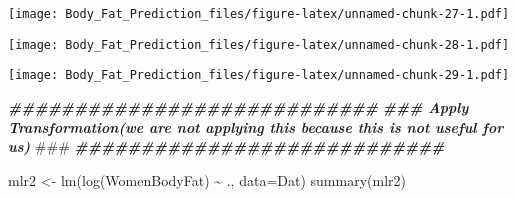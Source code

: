 \documentclass[
]{article}
\newenvironment{Shaded}{\begin{snugshade}}{\end{snugshade}}
\newcommand{\AlertTok}[1]{\textcolor[rgb]{0.94,0.16,0.16}{#1}}
\newcommand{\AttributeTok}[1]{\textcolor[rgb]{0.77,0.63,0.00}{#1}}
\newcommand{\DecValTok}[1]{\textcolor[rgb]{0.00,0.00,0.81}{#1}}
\newcommand{\DocumentationTok}[1]{\textcolor[rgb]{0.56,0.35,0.01}{\textbf{\textit{#1}}}}
\newcommand{\FunctionTok}[1]{\textcolor[rgb]{0.00,0.00,0.00}{#1}}
\newcommand{\NormalTok}[1]{#1}
\newcommand{\OtherTok}[1]{\textcolor[rgb]{0.56,0.35,0.01}{#1}}
\newcommand{\SpecialCharTok}[1]{\textcolor[rgb]{0.00,0.00,0.00}{#1}}
\newcommand{\StringTok}[1]{\textcolor[rgb]{0.31,0.60,0.02}{#1}}
\begin{document}
\texttt{[image: Body\_Fat\_Prediction\_files/figure-latex/unnamed-chunk-27-1.pdf]}

\begin{Shaded}
\end{Shaded}

\texttt{[image: Body\_Fat\_Prediction\_files/figure-latex/unnamed-chunk-28-1.pdf]}

\begin{Shaded}
\end{Shaded}

\texttt{[image: Body\_Fat\_Prediction\_files/figure-latex/unnamed-chunk-29-1.pdf]}

\begin{Shaded}
\begin{Highlighting}[]
\DocumentationTok{\#\#\#\#\#\#\#\#\#\#\#\#\#\#\#\#\#\#\#\#\#\#\#\#\#\#\#\#}
\DocumentationTok{\#\#\# Apply Transformation(we are not applying this because this is not useful for us) }\AlertTok{\#\#\#}
\DocumentationTok{\#\#\#\#\#\#\#\#\#\#\#\#\#\#\#\#\#\#\#\#\#\#\#\#\#\#\#\#}

\NormalTok{mlr2 }\OtherTok{\textless{}{-}} \FunctionTok{lm}\NormalTok{(}\FunctionTok{log}\NormalTok{(WomenBodyFat) }\SpecialCharTok{\textasciitilde{}}\NormalTok{ ., }\AttributeTok{data=}\NormalTok{Dat)}
\FunctionTok{summary}\NormalTok{(mlr2)}
\end{Highlighting}
\end{Shaded}
\end{document}
